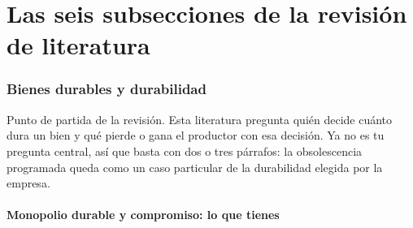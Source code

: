 \documentclass[11pt]{article}
\begin{document}
\part{Las seis subsecciones de la revisión de literatura}
\section{Bienes durables y durabilidad}
Punto de partida de la revisión. Esta literatura pregunta quién decide cuánto dura un bien y qué pierde o gana el productor con esa decisión. Ya no es tu pregunta central, así que basta con dos o tres párrafos: la obsolescencia programada queda como un caso particular de la durabilidad elegida por la empresa.

\subsection*{Monopolio durable y compromiso: lo que tienes}
\end{document}
